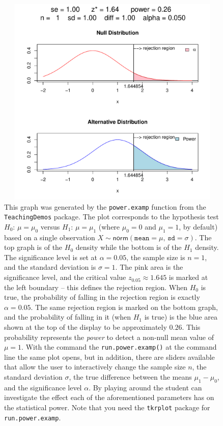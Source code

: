 \documentclass[captions=tableheading]{scrbook}
\begin{document}
\begin{figure}[th]
    \includegraphics[width=5in, height=4in]{img/power-examp.pdf}
    \caption[Plot of significance level and power]{\small This graph was generated by the \texttt{power.examp} function from the \texttt{TeachingDemos} package. The plot corresponds to the hypothesis test \(H_{0}:\,\mu=\mu_{0}\) versus \(H_{1}:\,\mu=\mu_{1}\) (where \(\mu_{0}=0\) and \(\mu_{1}=1\), by default) based on a single observation \(X\sim\mathsf{norm}(\mathtt{mean}=\mu,\,\mathtt{sd}=\sigma)\). The top graph is of the \(H_{0}\) density while the bottom is of the \(H_{1}\) density. The significance level is set at \(\alpha=0.05\), the sample size is \(n=1\), and the standard deviation is \(\sigma=1\). The pink area is the significance level, and the critical value \(z_{0.05}\approx1.645\) is marked at the left boundary -- this defines the rejection region. When \(H_{0}\) is true, the probability of falling in the rejection region is exactly \(\alpha=0.05\). The same rejection region is marked on the bottom graph, and the probability of falling in it (when \(H_{1}\)  is true) is the blue area shown at the top of the display to be approximately \(0.26\). This probability represents the \emph{power} to detect a non-null mean value of \(\mu=1\). With the command the \texttt{run.power.examp()} at the command line the same plot opens, but in addition, there are sliders available that allow the user to interactively change the sample size \(n\), the standard deviation \(\sigma\), the true difference between the means \(\mu_{1}-\mu_{0}\), and the significance level \(\alpha\). By playing around the student can investigate the effect each of the aforementioned parameters has on the statistical power. Note that you need the \texttt{tkrplot} package for \texttt{run.power.examp}.}
    \label{fig:power-examp}
  \end{figure}
\end{document}
